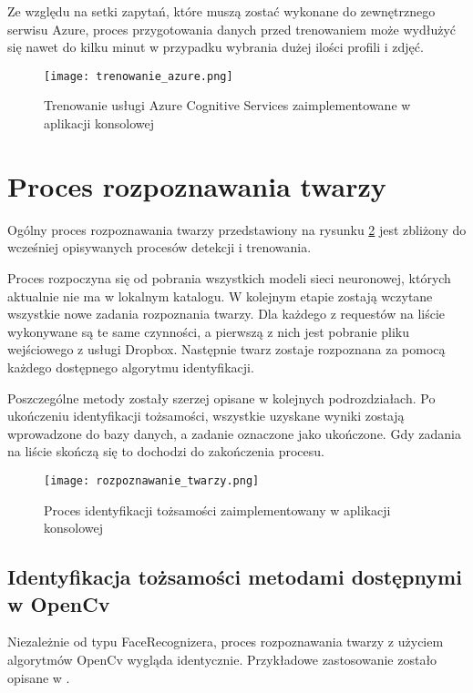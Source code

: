 Ze względu na setki zapytań, które muszą zostać wykonane do zewnętrznego serwisu Azure, proces przygotowania danych przed trenowaniem może wydłużyć się nawet do kilku minut w przypadku wybrania dużej ilości profili i zdjęć.
\begin{figure}[H]
	\centering
	\texttt{[image: trenowanie\_azure.png]}
	\caption{Trenowanie usługi Azure Cognitive Services zaimplementowane w aplikacji konsolowej}
	\label{fig:trenowanie_azure}
\end{figure}

\section{Proces rozpoznawania twarzy}
Ogólny proces rozpoznawania twarzy przedstawiony na rysunku \ref{fig:rozpoznawanie_proces} jest zbliżony do wcześniej opisywanych procesów detekcji i trenowania. 

Proces rozpoczyna się od pobrania wszystkich modeli sieci neuronowej, których aktualnie nie ma w lokalnym katalogu. W kolejnym etapie zostają wczytane wszystkie nowe zadania rozpoznania twarzy. Dla każdego z requestów na liście wykonywane są te same czynności, a pierwszą z nich jest pobranie pliku wejściowego z usługi Dropbox. Następnie twarz zostaje rozpoznana za pomocą każdego dostępnego algorytmu identyfikacji. 

Poszczególne metody zostały szerzej opisane w kolejnych podrozdziałach. Po ukończeniu identyfikacji tożsamości, wszystkie uzyskane wyniki zostają wprowadzone do bazy danych, a zadanie oznaczone jako ukończone. Gdy zadania na liście skończą się to dochodzi do zakończenia procesu.
\begin{figure}[H]
	\centering
	\texttt{[image: rozpoznawanie\_twarzy.png]}
	\caption{Proces identyfikacji tożsamości zaimplementowany w aplikacji konsolowej}
	\label{fig:rozpoznawanie_proces}
\end{figure}

\subsection{Identyfikacja tożsamości metodami dostępnymi w OpenCv}
Niezależnie od typu FaceRecognizera, proces rozpoznawania twarzy z użyciem algorytmów OpenCv wygląda identycznie. Przykładowe zastosowanie zostało opisane w . 

